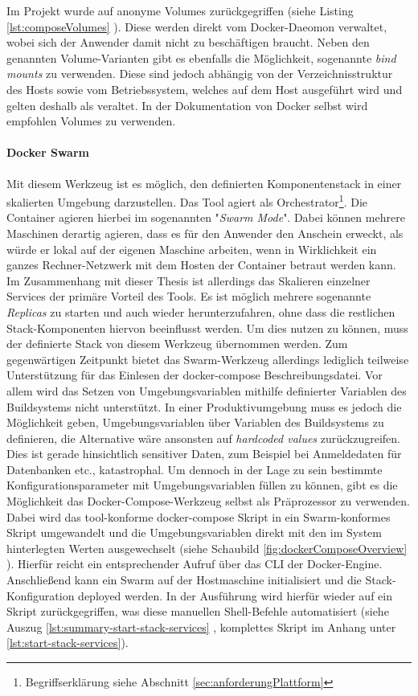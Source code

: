 Im Projekt wurde auf anonyme Volumes zurückgegriffen (siehe Listing \ref{lst:composeVolumes} ). Diese werden direkt vom Docker-Daeomon verwaltet, wobei sich der Anwender damit nicht zu beschäftigen braucht. Neben den genannten Volume-Varianten gibt es ebenfalls die Möglichkeit, sogenannte \emph{bind mounts} zu verwenden. Diese sind jedoch abhängig von der Verzeichnisstruktur des Hosts sowie vom Betriebssystem, welches auf dem Host ausgeführt wird und gelten deshalb als veraltet. In der Dokumentation von Docker selbst wird empfohlen Volumes zu verwenden.

\paragraph{Docker Swarm}
Mit diesem Werkzeug ist es möglich, den definierten Komponentenstack in einer skalierten Umgebung darzustellen. Das Tool agiert als Orchestrator\footnote{Begriffserklärung siehe Abschnitt \ref{sec:anforderungPlattform} }. Die Container agieren hierbei im sogenannten "\emph{Swarm Mode}". Dabei können mehrere Maschinen derartig agieren, dass es für den Anwender den Anschein erweckt, als würde er lokal auf der eigenen Maschine arbeiten, wenn in Wirklichkeit ein ganzes Rechner-Netzwerk mit dem Hosten der Container betraut werden kann. Im Zusammenhang mit dieser Thesis ist allerdings das Skalieren einzelner Services der primäre Vorteil des Tools. Es ist möglich mehrere sogenannte \emph{Replicas} zu starten und auch wieder herunterzufahren, ohne dass die restlichen Stack-Komponenten hiervon beeinflusst werden. Um dies nutzen zu können, muss der definierte Stack von diesem Werkzeug übernommen werden. Zum gegenwärtigen Zeitpunkt bietet das Swarm-Werkzeug allerdings lediglich teilweise Unterstützung für das Einlesen der docker-compose Beschreibungsdatei. Vor allem wird das Setzen von Umgebungsvariablen mithilfe definierter Variablen des Buildsystems nicht unterstützt. In einer Produktivumgebung muss es jedoch die Möglichkeit geben, Umgebungsvariablen über Variablen des Buildsystems zu definieren, die Alternative wäre ansonsten auf \emph{hardcoded values} zurückzugreifen. Dies ist gerade hinsichtlich sensitiver Daten, zum Beispiel bei Anmeldedaten für Datenbanken etc., katastrophal. Um dennoch in der Lage zu sein bestimmte Konfigurationsparameter mit Umgebungsvariablen füllen zu können, gibt es die Möglichkeit das Docker-Compose-Werkzeug selbst als Präprozessor zu verwenden. Dabei wird das tool-konforme docker-compose Skript in ein Swarm-konformes Skript umgewandelt und die Umgebungsvariablen direkt mit den im System hinterlegten Werten ausgewechselt (siehe Schaubild \ref{fig:dockerComposeOverview} ). Hierfür reicht ein entsprechender Aufruf über das CLI der Docker-Engine. Anschließend kann ein Swarm auf der Hostmaschine initialisiert und die Stack-Konfiguration deployed werden. In der Ausführung wird hierfür wieder auf ein Skript zurückgegriffen, was diese manuellen Shell-Befehle automatisiert (siehe Auszug \ref{lst:summary-start-stack-services} , komplettes Skript im Anhang unter \ref{lst:start-stack-services}).

